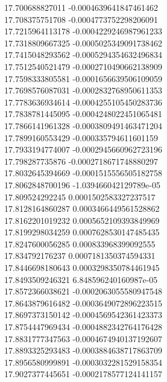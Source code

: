 {17.700688827011 -0.0004639641847461462 \\
17.708375751708 -0.0004773752298206091 \\
17.7215964113178 -0.0004229246987961233 \\
17.7318809667325 -0.0005025349091738462 \\
17.7415048293562 -0.0005294354632496834 \\
17.7512540521479 -0.0002710490662138909 \\
17.7598333805581 -0.0001656639506109059 \\
17.7698576087031 -0.0002832768950611353 \\
17.7783636934614 -0.0004255105450283736 \\
17.7838781445095 -0.0004248022451065481 \\
17.7866141961328 -0.0003809491463471204 \\
17.7899160553429 -0.000335794611601159 \\
17.7933194774007 -0.0002945660962723196 \\
17.798287735876 -0.0002718671748880297 \\
17.8032645394669 -0.0001515556505182758 \\
17.8062848700196 -1.039466042129789e-05 \\
17.809524292245 0.0001502583327237517 \\
17.8128164860287 0.0003466449561528862 \\
17.8162201019232 0.0005652109393849969 \\
17.8199298034259 0.0007628530147485435 \\
17.8247600056285 0.000833968399092555 \\
17.834792176237 0.0007181350374594331 \\
17.8446698180643 0.0003298350784461945 \\
17.8493509246321 6.848596240160987e-05 \\
17.8572366038621 -0.0002063055580947548 \\
17.8643879616482 -0.0003649072896223515 \\
17.8697373150142 -0.0004569542361423373 \\
17.8754447969434 -0.0004882342764176428 \\
17.8831777347563 -0.0004674940137192607 \\
17.8893325293483 -0.0003884638717863709 \\
17.8956580999891 -0.0003032281529158354 \\
17.9027377445651 -0.0002178577124141157 \\
}
